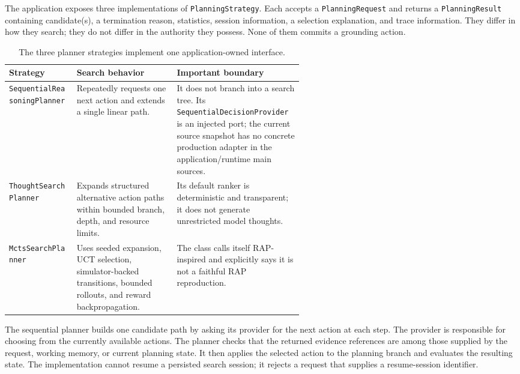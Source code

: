 The application exposes three implementations of \texttt{PlanningStrategy}. Each accepts a \texttt{PlanningRequest} and returns a \texttt{PlanningResult} containing candidate(s), a termination reason, statistics, session information, a selection explanation, and trace information. They differ in how they search; they do not differ in the authority they possess. None of them commits a grounding action.

\begin{table}[H]
\centering
\small
\begin{tabularx}{\linewidth}{>{\raggedright\arraybackslash}p{0.23\linewidth}>{\raggedright\arraybackslash}p{0.34\linewidth}X}
\toprule
\textbf{Strategy} & \textbf{Search behavior} & \textbf{Important boundary} \\
\midrule
\texttt{SequentialReasoning\allowbreak Planner} & Repeatedly requests one next action and extends a single linear path. & It does not branch into a search tree. Its \texttt{Sequential\allowbreak DecisionProvider} is an injected port; the current source snapshot has no concrete production adapter in the application/runtime main sources. \\
\texttt{ThoughtSearch\allowbreak Planner} & Expands structured alternative action paths within bounded branch, depth, and resource limits. & Its default ranker is deterministic and transparent; it does not generate unrestricted model thoughts. \\
\texttt{MctsSearch\allowbreak Planner} & Uses seeded expansion, UCT selection, simulator-backed transitions, bounded rollouts, and reward backpropagation. & The class calls itself RAP-inspired and explicitly says it is not a faithful RAP reproduction. \\
\bottomrule
\end{tabularx}
\caption{The three planner strategies implement one application-owned interface.}
\label{tab:ch20-planners}
\end{table}

The sequential planner builds one candidate path by asking its provider for the next action at each step. The provider is responsible for choosing from the currently available actions. The planner checks that the returned evidence references are among those supplied by the request, working memory, or current planning state. It then applies the selected action to the planning branch and evaluates the resulting state. The implementation cannot resume a persisted search session; it rejects a request that supplies a resume-session identifier.

